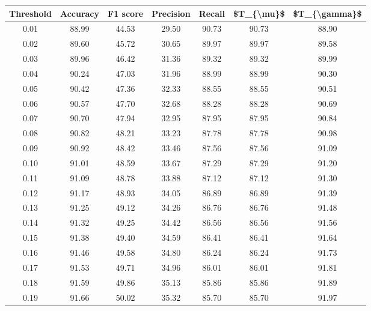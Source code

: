 \begin{tabular}{|c|c|c|c|c|c|c|}
\hline
 Threshold &  Accuracy &  F1 score &  Precision &  Recall &  \$T\_\{\textbackslash mu\}\$ &  \$T\_\{\textbackslash gamma\}\$ \\
\hline
      0.01 &     88.99 &     44.53 &      29.50 &   90.73 &      90.73 &         88.90 \\
      0.02 &     89.60 &     45.72 &      30.65 &   89.97 &      89.97 &         89.58 \\
      0.03 &     89.96 &     46.42 &      31.36 &   89.32 &      89.32 &         89.99 \\
      0.04 &     90.24 &     47.03 &      31.96 &   88.99 &      88.99 &         90.30 \\
      0.05 &     90.42 &     47.36 &      32.33 &   88.55 &      88.55 &         90.51 \\
      0.06 &     90.57 &     47.70 &      32.68 &   88.28 &      88.28 &         90.69 \\
      0.07 &     90.70 &     47.94 &      32.95 &   87.95 &      87.95 &         90.84 \\
      0.08 &     90.82 &     48.21 &      33.23 &   87.78 &      87.78 &         90.98 \\
      0.09 &     90.92 &     48.42 &      33.46 &   87.56 &      87.56 &         91.09 \\
      0.10 &     91.01 &     48.59 &      33.67 &   87.29 &      87.29 &         91.20 \\
      0.11 &     91.09 &     48.78 &      33.88 &   87.12 &      87.12 &         91.30 \\
      0.12 &     91.17 &     48.93 &      34.05 &   86.89 &      86.89 &         91.39 \\
      0.13 &     91.25 &     49.12 &      34.26 &   86.76 &      86.76 &         91.48 \\
      0.14 &     91.32 &     49.25 &      34.42 &   86.56 &      86.56 &         91.56 \\
      0.15 &     91.38 &     49.40 &      34.59 &   86.41 &      86.41 &         91.64 \\
      0.16 &     91.46 &     49.58 &      34.80 &   86.24 &      86.24 &         91.73 \\
      0.17 &     91.53 &     49.71 &      34.96 &   86.01 &      86.01 &         91.81 \\
      0.18 &     91.59 &     49.86 &      35.13 &   85.86 &      85.86 &         91.89 \\
      0.19 &     91.66 &     50.02 &      35.32 &   85.70 &      85.70 &         91.97 \\

\end{tabular}

